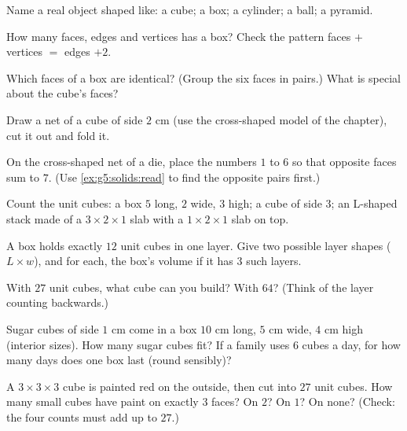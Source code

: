 \begin{exercise}[$\star$]\label{exo:g5:solids:1}
Name a real object shaped like: a cube; a box; a cylinder; a ball;
a pyramid.
\end{exercise}

\begin{exercise}[$\star$]\label{exo:g5:solids:2}
How many faces, edges and vertices has a box? Check the pattern
faces $+$ vertices $=$ edges $+ 2$.
\end{exercise}

\begin{exercise}[$\star$]\label{exo:g5:solids:3}
Which faces of a box are identical? (Group the six faces in pairs.)
What is special about the cube's faces?
\end{exercise}

\begin{exercise}[$\star$]\label{exo:g5:solids:4}
Draw a net of a cube of side $2$ cm (use the cross-shaped model of
the chapter), cut it out and fold it.
\end{exercise}

\begin{exercise}[$\star$]\label{exo:g5:solids:5}
On the cross-shaped net of a die, place the numbers $1$ to $6$ so
that opposite faces sum to $7$. (Use \cref{ex:g5:solids:read} to
find the opposite pairs first.)
\end{exercise}

\begin{exercise}[$\star$]\label{exo:g5:solids:6}
Count the unit cubes: a box $5$ long, $2$ wide, $3$ high; a cube of
side $3$; an L-shaped stack made of a $3 \times 2 \times 1$ slab
with a $1 \times 2 \times 1$ slab on top.
\end{exercise}

\begin{exercise}[$\star$]\label{exo:g5:solids:7}
A box holds exactly $12$ unit cubes in one layer. Give two possible
layer shapes ($L \times w$), and for each, the box's volume if it
has $3$ such layers.
\end{exercise}

\begin{exercise}[$\star$]\label{exo:g5:solids:8}
With $27$ unit cubes, what cube can you build? With $64$? (Think of
the layer counting backwards.)
\end{exercise}

\begin{exercise}[$\star\star$]\label{exo:g5:solids:9}
Sugar cubes of side $1$ cm come in a box $10$ cm long, $5$ cm wide,
$4$ cm high (interior sizes). How many sugar cubes fit? If a
family uses $6$ cubes a day, for how many days does one box last
(round sensibly)?
\end{exercise}

\begin{exercise}[$\star\star$]\label{exo:g5:solids:10}
A $3 \times 3 \times 3$ cube is painted red on the outside, then cut
into $27$ unit cubes. How many small cubes have paint on exactly
$3$ faces? On $2$? On $1$? On none? (Check: the four counts must add
up to $27$.)
\end{exercise}

